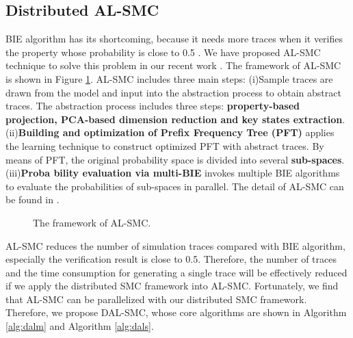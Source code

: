 \subsection{Distributed AL-SMC}
BIE algorithm has its shortcoming, because it needs more traces when it verifies the property whose probability is close to 0.5 \cite{zuliani2013bayesian}. We have proposed AL-SMC technique to solve this problem in our recent work \cite{jiangkaiqiang2016}. The framework of AL-SMC is shown in Figure \ref{al-smc}. AL-SMC includes three main steps: (i)Sample traces are drawn from the model and input into the abstraction process to obtain abstract traces. The abstraction process includes three steps: \textbf{property-based projection, PCA-based dimension reduction \cite{dunteman1989principal} and key states extraction}. (ii)\textbf{Building and optimization of Prefix Frequency Tree (PFT)} applies the learning technique \cite{carrasco1994learning} to construct optimized PFT with abstract traces. By means of PFT, the original probability space is divided into several \textbf{sub-spaces}. (iii)\textbf{Proba
bility evaluation via multi-BIE} invokes multiple BIE algorithms to evaluate the probabilities of sub-spaces in parallel. The detail of AL-SMC can be found in \cite{jiangkaiqiang2016}.
\begin{figure}[htbp]
	\caption{The framework of AL-SMC.}\label{al-smc}
\end{figure}
AL-SMC reduces the number of simulation traces compared with BIE algorithm, especially the verification result is close to 0.5. Therefore, the number of traces and the time consumption for generating a single trace will be effectively reduced if we apply the distributed SMC framework into AL-SMC. Fortunately, we find that AL-SMC can be  parallelized with our distributed SMC framework. Therefore, we propose DAL-SMC, whose core algorithms are shown in Algorithm \ref{alg:dalm} and Algorithm \ref{alg:dals}.

